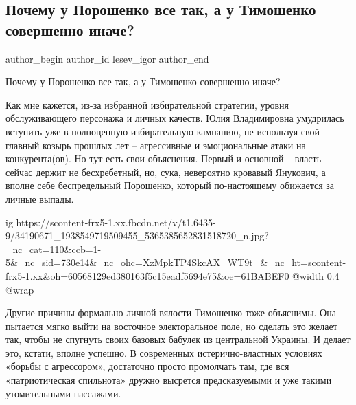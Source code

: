  
 
 
 
 
 
\subsection{Почему у Порошенко все так, а у Тимошенко совершенно иначе?}
\label{sec:03_06_2018.fb.lesev_igor.1.poroshenko_timoshenko}
 
\ifcmt
 author_begin
   author_id lesev_igor
 author_end
\fi

Почему у Порошенко все так, а у Тимошенко совершенно иначе?

Как мне кажется, из-за избранной избирательной стратегии, уровня обслуживающего
персонажа и личных качеств. Юлия Владимировна умудрилась вступить уже в
полноценную избирательную кампанию, не используя свой главный козырь прошлых
лет – агрессивные и эмоциональные атаки на конкурента(ов). Но тут есть свои
объяснения. Первый и основной – власть сейчас держит не бесхребетный, но, сука,
невероятно кровавый Янукович, а вполне себе беспредельный Порошенко, который
по-настоящему обижается за личные выпады.

\ifcmt
  ig https://scontent-frx5-1.xx.fbcdn.net/v/t1.6435-9/34190671_1938549719509455_5365385652831518720_n.jpg?_nc_cat=110&ccb=1-5&_nc_sid=730e14&_nc_ohc=XzMpkTP4SkcAX_WT9t_&_nc_ht=scontent-frx5-1.xx&oh=60568129ed380163f5c15eadf5694e75&oe=61BABEF0
  @width 0.4
  @wrap 
\fi

Другие причины формально личной вялости Тимошенко тоже объяснимы. Она пытается
мягко выйти на восточное электоральное поле, но сделать это желает так, чтобы
не спугнуть своих базовых бабулек из центральной Украины. И делает это, кстати,
вполне успешно. В современных истерично-властных условиях «борьбы с
агрессором», достаточно просто промолчать там, где вся «патриотическая
спильнота» дружно высрется предсказуемыми и уже такими утомительными пассажами.

